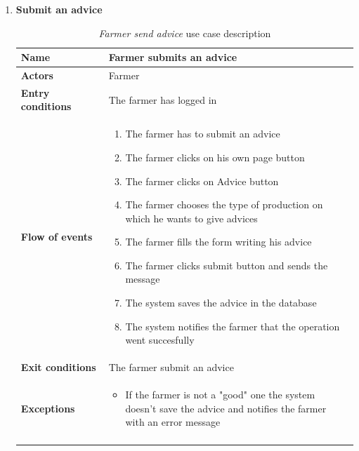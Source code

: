 \begin{enumerate}
    \item \textbf{Submit an advice}
    \begin{longtable}{p{0.26\linewidth}p{0.75\linewidth}}
        \toprule
        \textbf{Name} & \textbf{Farmer submits an advice} \\
        \midrule
        \textbf{Actors} & Farmer \\
        \midrule
        \textbf{Entry conditions} & The farmer has logged in\\
        \midrule
        \textbf{Flow of events} & 
        \begin{enumerate}
            \item The farmer has to submit an advice 
            \item The farmer clicks on his own page button
            \item The farmer clicks on Advice button
            \item The farmer chooses the type of production on which he wants to give advices
            \item The farmer fills the form writing his advice
            \item The farmer clicks submit button and sends the message
            \item The system saves the advice in the database
            \item The system notifies the farmer that the operation went succesfully 
        \end{enumerate} \\
        \midrule
        \textbf{Exit conditions} & The farmer submit an advice\\
        \midrule
        \textbf{Exceptions} & 
        \begin{itemize}
            \item If the farmer is not a "good" one the system doesn't save the advice and notifies the farmer with an error message
        \end{itemize}\\
        \bottomrule
        \caption{\emph{Farmer send advice} use case description}
    \end{longtable}


\end{enumerate}
